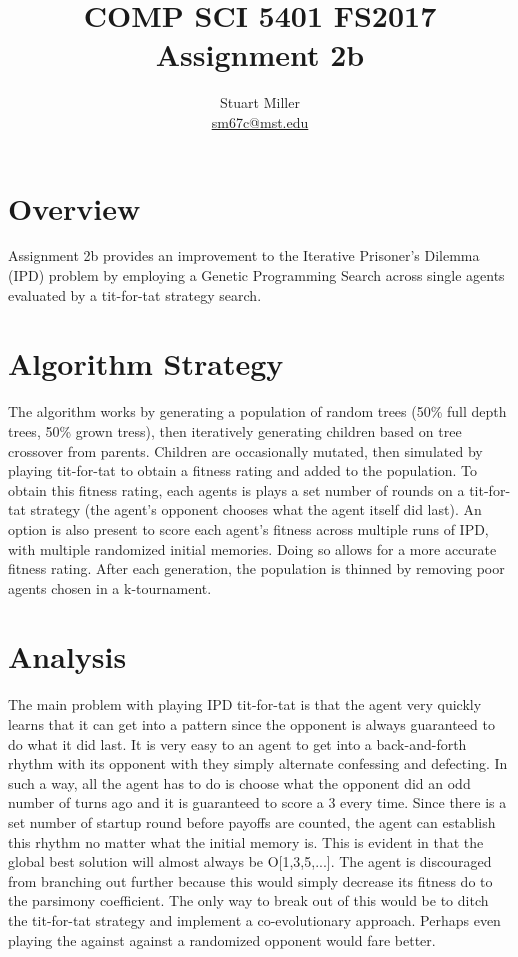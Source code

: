 \documentclass[11pt]{article}
\begin{document}
\title{COMP SCI 5401 FS2017 Assignment 2b}
\author{Stuart Miller\\\href{mailto:sm67c@mst.edu}{sm67c@mst.edu}}
\maketitle


\section{Overview}\label{sect:overview}

Assignment 2b provides an improvement to the Iterative Prisoner's Dilemma (IPD) problem by employing a Genetic Programming Search across single agents evaluated by a tit-for-tat strategy search. 


\section{Algorithm Strategy}\label{sect:alg_strat}
The algorithm works by generating a population of random trees (50\% full depth trees, 50\% grown tress), then iteratively generating children based on tree crossover from parents. Children are occasionally mutated, then simulated by playing tit-for-tat to obtain a fitness rating and added to the population. To obtain this fitness rating, each agents is plays a set number of rounds on a tit-for-tat strategy (the agent's opponent chooses what the agent itself did last). An option is also present to score each agent's fitness across multiple runs of IPD, with multiple randomized initial memories. Doing so allows for a more accurate fitness rating. After each generation, the population is thinned by removing poor agents chosen in a k-tournament. 

\section{Analysis}\label{sect:analysis}
The main problem with playing IPD tit-for-tat is that the agent very quickly learns that it can get into a pattern since the opponent is always guaranteed to do what it did last. It is very easy to an agent to get into a back-and-forth rhythm with its opponent with they simply alternate confessing and defecting. In such a way, all the agent has to do is choose what the opponent did an odd number of turns ago and it is guaranteed to score a 3 every time. Since there is a set number of startup round before payoffs are counted, the agent can establish this rhythm no matter what the initial memory is. This is evident in that the global best solution will almost always be O[1,3,5,...]. The agent is discouraged from branching out further because this would simply decrease its fitness do to the parsimony coefficient. The only way to break out of this would be to ditch the tit-for-tat strategy and implement a co-evolutionary approach. Perhaps even playing the against against a randomized opponent would fare better.
\end{document}
